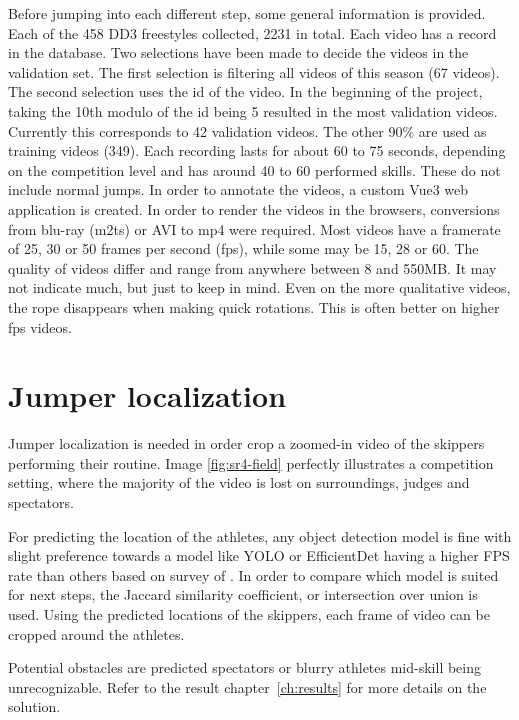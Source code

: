 Before jumping into each different step, some general information is provided. Each of the 458 DD3 freestyles collected, 2231 in total. Each video has a record in the database. Two selections have been made to decide the videos in the validation set. The first selection is filtering all videos of this season (67 videos). The second selection uses the id of the video. In the beginning of the project, taking the 10th modulo of the id being 5 resulted in the most validation videos. Currently this corresponds to 42 validation videos. The other 90\% are used as training videos (349).
Each recording lasts for about 60 to 75 seconds, depending on the competition level and has around 40 to 60 performed skills. These do not include normal jumps. In order to annotate the videos, a custom Vue3 web application is created. In order to render the videos in the browsers, conversions from blu-ray (m2ts) or AVI to mp4 were required. Most videos have a framerate of 25, 30 or 50 frames per second (fps), while some may be 15, 28 or 60.
The quality of videos differ and range from anywhere between 8 and 550MB. It may not indicate much, but just to keep in mind. Even on the more qualitative videos, the rope disappears when making quick rotations. This is often better on higher fps videos.

\section{Jumper localization}
\label{methodology:jumper-localization}

Jumper localization is needed in order crop a zoomed-in video of the skippers performing their routine. Image \ref{fig:sr4-field} perfectly illustrates a competition setting, where the majority of the video is lost on surroundings, judges and spectators.

For predicting the location of the athletes, any object detection model is fine with slight preference towards a model like YOLO or EfficientDet having a higher FPS rate than others based on survey of \textcite{Zaidi_2021}. In order to compare which model is suited for next steps, the Jaccard similarity coefficient, or intersection over union is used. 
Using the predicted locations of the skippers, each frame of video can be cropped around the athletes.

Potential obstacles are predicted spectators or blurry athletes mid-skill being unrecognizable. Refer to the result chapter~\ref{ch:results} for more details on the solution.

